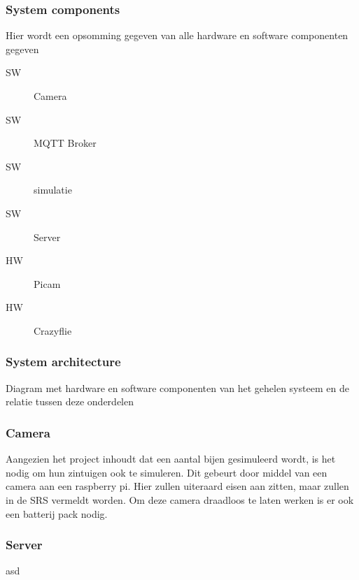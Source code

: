 \subsubsection{System components}
Hier wordt een opsomming gegeven van alle hardware en software componenten gegeven

\begin{description}
    \item[SW] Camera
    \item[SW] MQTT Broker
    \item[SW] simulatie
    \item[SW] Server
    \item[HW] Picam
    \item[HW] Crazyflie
\end{description}

\subsubsection{System architecture}
Diagram met hardware en software componenten van het gehelen systeem en de relatie tussen deze onderdelen
\subsubsection*{Camera}
Aangezien het project inhoudt dat een aantal bijen gesimuleerd wordt, is het nodig om hun zintuigen ook te simuleren. Dit gebeurt door middel van een camera aan een raspberry pi. Hier zullen uiteraard eisen aan zitten, maar zullen in de SRS vermeldt worden. Om deze camera draadloos te laten werken is er ook een batterij pack nodig.

\subsubsection*{Server}
asd
\newline

